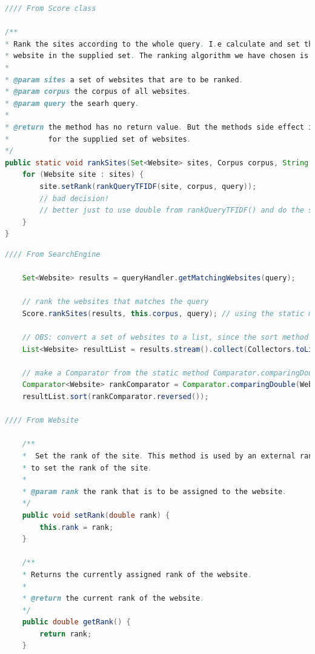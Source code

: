 \begin{lstlisting}[language={Java}, caption={Snippet from the Score utility class.}, label={lst:ScoreUtilityClass}]
//// From Score class 

/**
* Rank the sites according to the whole query. I.e calculate and set the rank field of each
* website in the supplied set. The ranking algorithm we have chosen is TFIDF.
* 
* @param sites a set of websites that are to be ranked.
* @param corpus the corpus of all websites.
* @param query the searh query.
* 
* @return the method has no return value. But the methods side effect is to set the rank field
*         for the supplied set of websites.
*/
public static void rankSites(Set<Website> sites, Corpus corpus, String query) {
	for (Website site : sites) {
		site.setRank(rankQueryTFIDF(site, corpus, query)); 
		// bad decision! 
		// better just to use double from rankQueryTFIDF() and do the sorting imidiately. 
	}
}
\end{lstlisting}

\begin{lstlisting}[language={Java}, caption={Snippets from SearchEngine and Website, from the first implementation where Score was a utility class.}, label={lst:ScoreUtilityClass-2}]
//// From SearchEngine 

	Set<Website> results = queryHandler.getMatchingWebsites(query);
	
	// rank the websites that matches the query
	Score.rankSites(results, this.corpus, query); // using the static method Score.rankSites.
	
	// OBS: convert a set of websites to a list, since the sort method only works for list.
	List<Website> resultList = results.stream().collect(Collectors.toList());  
	
	// make a Comparator from the static method Comparator.comparingDouble()
	Comparator<Website> rankComparator = Comparator.comparingDouble(Website::getRank);
	resultList.sort(rankComparator.reversed()); 

//// From Website

	/**
	*  Set the rank of the site. This method is used by an external ranking method
	* to set the rank of the site. 
	* 
	* @param rank the rank that is to be assigned to the website.  
	*/
	public void setRank(double rank) {
		this.rank = rank;
	}

	/**
	* Returns the currently assigned rank of the website. 
	* 
	* @return the current rank of the website. 
	*/
	public double getRank() {
		return rank;
	}
\end{lstlisting}


